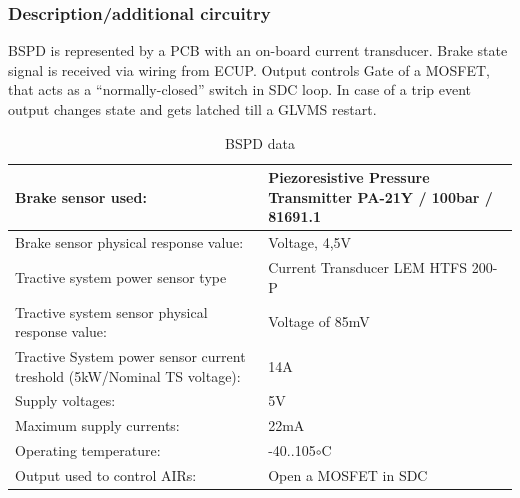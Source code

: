 
\subsubsection{Description/additional circuitry}

BSPD is represented by a PCB with an on-board current transducer. Brake state signal is received via wiring from ECUP. Output controls Gate of a MOSFET, that acts as a “normally-closed” switch in SDC loop. In case of a trip event output changes state and gets latched till a GLVMS restart.

\begin{table}[H]
	\centering
	\caption{BSPD data}
	\begin{tabularx}{\textwidth}{|X|X|}
		\hline
		Brake sensor used: & Piezoresistive Pressure Transmitter PA-21Y / 100bar / 81691.1 \\[\TableSize]
		\hline
		Brake sensor physical response value: & Voltage, 4,5V \\[\TableSize]
		\hline
		Tractive system power sensor type & Current Transducer LEM HTFS 200-P \\[\TableSize]
		\hline
		Tractive system sensor physical response value: & Voltage of 85mV \\[\TableSize]
		\hline
		Tractive System power sensor current treshold (5kW/Nominal TS voltage): & 14A \\[\TableSize]
		\hline
		Supply voltages: & 5V \\[\TableSize]
		\hline
		Maximum supply currents: & 22mA \\[\TableSize]
		\hline
		Operating temperature: & -40..105$\circ$C\\[\TableSize]
		\hline
		Output used to control AIRs: & Open a MOSFET in SDC \\[\TableSize]
		\hline
	\end{tabularx}%
	\label{tab:addlabel}%
\end{table}%

